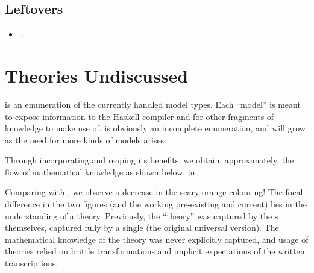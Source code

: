 
\subsection{Leftovers}


\begin{itemize}

	\item \OthModel{} \ldots{}

\end{itemize}

\section{Theories Undiscussed}

\ModelKinds{} is an enumeration of the currently handled model types. Each
``model'' is meant to expose information to the Haskell compiler and for other
fragments of knowledge to make use of. \ModelKinds{} is obviously an incomplete
enumeration, and will grow as the need for more kinds of models arises.

Through incorporating \ModelKinds{} and reaping its benefits, we obtain,
approximately, the flow of mathematical knowledge as shown below, in
.

\theoriesWithModelKinds{}

Comparing  with , we
observe a decrease in the scary orange colouring! The focal difference in the
two figures (and the working pre-existing and current) lies in the understanding
of a theory. Previously, the ``theory'' was captured by the \RelationConcept{}s
themselves, captured fully by a single \Expr{} (the original universal version).
The mathematical knowledge of the theory was never explicitly captured, and
usage of theories relied on brittle transformations and implicit expectations of
the written transcriptions.



